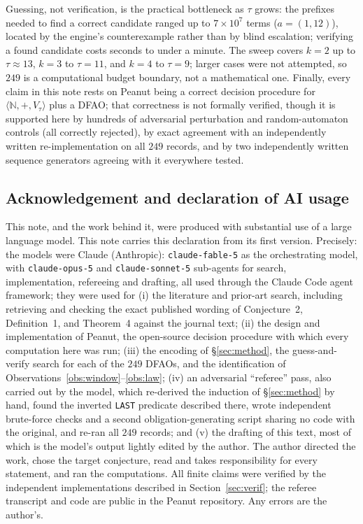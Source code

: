 \documentclass[10pt,reqno]{amsart}
\theoremstyle{plain}
\theoremstyle{definition}
\theoremstyle{remark}
\numberwithin{theorem}{section}
\newcommand{\N}{\mathbb{N}}
\begin{document}
Guessing, not verification, is the practical bottleneck as $\tau$ grows: the prefixes needed to
find a correct candidate ranged up to $7\times10^7$ terms ($a=(1,12)$), located by the engine's
counterexample rather than by blind escalation; verifying a found candidate costs seconds to
under a minute. The sweep covers $k=2$ up to $\tau\approx13$, $k=3$ to $\tau=11$, and $k=4$ to
$\tau=9$; larger cases were not attempted, so $249$ is a computational budget boundary, not a
mathematical one. Finally, every claim in this note rests on Peanut being a correct decision
procedure for $\langle\N,+,V_\tau\rangle$ plus a DFAO; that correctness is not formally verified,
though it is supported here by hundreds of adversarial perturbation and random-automaton
controls (all correctly rejected), by exact agreement with an independently written
re-implementation on all $249$ records, and by two independently written sequence generators
agreeing with it everywhere tested.

\subsection*{Acknowledgement and declaration of AI usage}
This note, and the work behind it, were produced with substantial use of a large language
model. This note carries this declaration from its first version. Precisely: the models were Claude (Anthropic): \texttt{claude-fable-5} as the orchestrating model, with \texttt{claude-opus-5} and \texttt{claude-sonnet-5} sub-agents for search, implementation, refereeing and drafting, all used through the Claude Code agent framework; they were used for (i) the literature and prior-art search, including retrieving and checking
the exact published wording of Conjecture~2, Definition~1, and Theorem~4 against the journal
text; (ii) the design and implementation of Peanut, the open-source decision procedure with
which every computation here was run; (iii) the encoding of \S\ref{sec:method}, the
guess-and-verify search for each of the $249$ DFAOs, and the identification of
Observations~\ref{obs:window}--\ref{obs:law}; (iv) an adversarial ``referee'' pass, also carried
out by the model, which re-derived the induction of \S\ref{sec:method} by hand, found the
inverted \texttt{LAST} predicate described there, wrote independent brute-force checks and a
second obligation-generating script sharing no code with the original, and re-ran all $249$
records; and (v) the drafting of this text, most of which is the model's output lightly edited
by the author. The author directed the work, chose the target conjecture, read and takes
responsibility for every statement, and ran the computations. All finite claims were verified by
the independent implementations described in Section~\ref{sec:verif}; the referee transcript and
code are public in the Peanut repository. Any errors are the author's.
\end{document}
